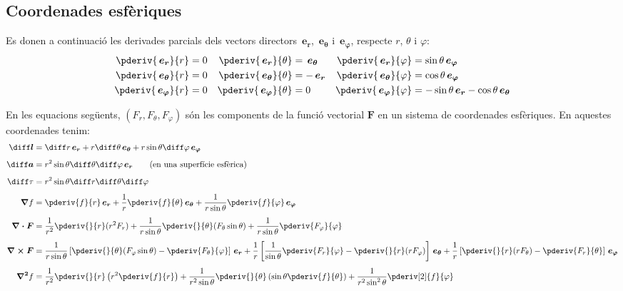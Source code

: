 \documentclass[catalan,a4paper,twoside,11pt]{article}
\begin{document}
\subsection{Coordenades esfèriques}

\renewcommand{\va}{\ensuremath{\,\boldsymbol{e_r}}}
\renewcommand{\vb}{\ensuremath{\,\boldsymbol{e_\theta}}}
\renewcommand{\vc}{\ensuremath{\,\boldsymbol{e_\varphi}}}

Es donen a continuació les derivades parcials dels vectors directors $\va$, $\vb$ i $\vc$, respecte  $r$, $\theta$ i $\varphi$:
\begin{subequations}
\begin{align}
   \pderiv{\va}{r} &= 0 & \pderiv{\va}{\theta} &= \vb  & \pderiv{\va}{\varphi} &= \sin\theta\vc \\
   \pderiv{\vb}{r} &= 0 & \pderiv{\vb}{\theta} &= -\va & \pderiv{\vb}{\varphi} &= \cos\theta\vc \\
   \pderiv{\vc}{r} &= 0 & \pderiv{\vc}{\theta} &= 0    & \pderiv{\vc}{\varphi} &= -\sin\theta\va-\cos\theta\vb
\end{align}
\end{subequations}

En les equacions següents, $(F_r,F_\theta,F_\varphi)$  són
les components de la funció  vectorial  $\boldsymbol{F}$ en un sistema de
coordenades esfèriques. En aquestes coordenades tenim:
\begin{align}
    \boldsymbol{\diff l} &= \diff r \va + r\diff\theta \vb + r \sin\theta\diff \varphi \vc\\[1ex]
    \boldsymbol{\diff a} &= r^2 \sin\theta \diff \theta \diff \varphi \va\qquad\text{(en una superfície esfèrica)}\\[1ex]
    \diff\tau &= r^2 \sin\theta\diff r \diff \theta \diff \varphi\\[1ex]
    \boldsymbol{\nabla}f &= \pderiv{f}{r}\va + \frac{1}{r}\pderiv{f}{\theta}\vb
    + \frac{1}{r\sin\theta}\pderiv{f}{\varphi}\vc\\[1ex]
    \boldsymbol{\nabla\cdot F} &= \frac{1}{r^2}\pderiv{}{r}(r^2 F_r) +
    \frac{1}{r\sin\theta}\pderiv{}{\theta}(F_\theta\sin\theta)+
    \frac{1}{r\sin\theta}\pderiv{F_\varphi}{\varphi}\\[1ex]
    \boldsymbol{\nabla\times F} &= \frac{1}{r\sin\theta}\left[\pderiv{}{\theta}
    (F_\varphi\sin\theta)-\pderiv{F_\theta}{\varphi}\right]\va +
    \frac{1}{r}\left[\frac{1}{\sin\theta}\pderiv{F_r}{\varphi}-
    \pderiv{}{r}(r F_\varphi)\right]\vb +\frac{1}{r}\left[\pderiv{}{r}(r F_\theta)-\pderiv{F_r}{\theta}\right]\vc\\[1ex]
    \boldsymbol{\nabla^2}f &= \frac{1}{r^2}\pderiv{}{r}\left(r^2\pderiv{f}{r}
    \right) + \frac{1}{r^2\sin\theta}\pderiv{}{\theta}\left(\sin\theta\pderiv{f}{\theta}\right) +
    \frac{1}{r^2\sin^2\theta}\pderiv[2]{f}{\varphi}
\end{align}
\end{document}
